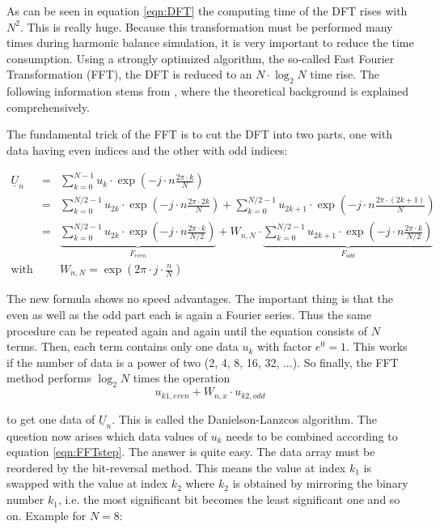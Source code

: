 \addvspace{12pt}

As can be seen in equation \ref{eqn:DFT} the computing time of the
DFT rises with $N^2$. This is really huge. Because this transformation
must be performed many times during harmonic balance simulation, it is
very important to reduce the time consumption. Using a strongly
optimized algorithm, the so-called Fast Fourier Transformation (FFT),
the DFT is reduced to an $N\cdot\log_2 N$ time rise.
The following information stems from \cite{Press},
where the theoretical background is explained comprehensively.

\addvspace{12pt}

The fundamental trick of the FFT is to cut the DFT into two parts,
one with data having even indices and the other with odd indices:

\begin{eqnarray}
\underline{U}_n & = &
  \sum_{k=0}^{N-1} u_k\cdot \exp\left( -j\cdot n\frac{2\pi\cdot k}{N} \right) \\
  & = & \sum_{k=0}^{N/2-1} u_{2k}\cdot
        \exp\left( -j\cdot n\frac{2\pi\cdot 2k}{N} \right) +
        \sum_{k=0}^{N/2-1} u_{2k+1}\cdot
        \exp\left( -j\cdot n\frac{2\pi\cdot (2k+1)}{N} \right) \\
  & = & \underbrace{ \sum_{k=0}^{N/2-1} u_{2k}\cdot
        \exp\left( -j\cdot n\frac{2\pi\cdot k}{N/2} \right) }_{F_{even}} +
        W_{n,N}\cdot \underbrace{ \sum_{k=0}^{N/2-1} u_{2k+1}\cdot
        \exp\left( -j\cdot n\frac{2\pi\cdot k}{N/2} \right) }_{F_{odd}} \\
\text{with} & & W_{n,N} = \exp\left( 2\pi\cdot j\cdot \frac{n}{N} \right)
\end{eqnarray}

The new formula shows no speed advantages. The important thing is that
the even as well as the odd part each is again a Fourier series. Thus
the same procedure can be repeated again and again until the equation
consists of $N$ terms. Then, each term contains only one data $u_k$
with factor $e^0=1$. This works if the number of data is a power of
two (2, 4, 8, 16, 32, ...).
So finally, the FFT method performs $\log_2 N$ times the operation
\begin{equation}
\label{eqn:FFTstep}
u_{k1,even} + W_{n,x}\cdot u_{k2,odd}
\end{equation}

to get one data of $\underline{U}_n$. This is called the
Danielson-Lanzcos algorithm.
The question now arises which data values of $u_k$
needs to be combined according to equation \eqref{eqn:FFTstep}.
The answer is quite easy. The data array must be reordered by the
bit-reversal method. This means the value at index $k_1$ is swapped
with the value at index $k_2$ where $k_2$ is obtained by mirroring
the binary number $k_1$, i.e. the most significant bit becomes the
least significant one and so on. Example for $N=8$:


